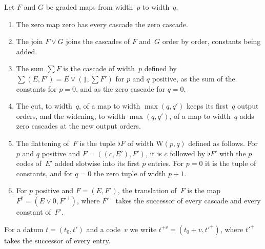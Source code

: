 \documentclass[11pt]{amsart}
\makeatletter
\newcommand{\bplus}{\mathbin{+}}
\newcommand{\num}[1]{\underline{#1}}          %
\newcommand{\W}{\mathrm{W}}
\newcommand{\tsum}[1]{\textstyle\sum #1}
\newif\ifagdarefs
\newcommand{\AgdaRefs}[1]{\ifagdarefs{\footnotesize\color{agdablue}(#1)}\else\unskip\fi}
\newcommand{\Agda}[2]{{\footnotesize\color{agdablue}\textsf{#1}%
  \ifblank{#2}{}{\texttt{.}\allowbreak\texttt{#2}}}}
\let\ttt@plain\texttt
\renewcommand{\texttt}[1]{{\footnotesize\color{agdablue}\ttt@plain{#1}}}
\theoremstyle{plain}
\theoremstyle{definition}
\makeatother
\begin{document}
\begin{definition}
\label{def:rect-ops}
Let $F$ and $G$ be graded maps from width~$p$ to width~$q$.
\begin{enumerate}
\item The zero map $\mathrm{zero}$ has every cascade the zero
  cascade.
\item The join $F \vee G$ joins the cascades of $F$ and~$G$ order by
  order, constants being added.
\item The sum $\tsum F$ is the cascade of width~$p$ defined by
  $\tsum (E, F') = E \vee (\num 1, \tsum F')$ for $p$ and $q$
  positive, as the sum of the constants for $p = 0$, and as the zero
  cascade for $q = 0$.
\item The cut, to width~$q$, of a map to width $\max(q,q')$ keeps its
  first~$q$ output orders, and the widening, to width $\max(q,q')$, of
  a map to width~$q$ adds zero cascades at the new output orders.
\item The flattening of~$F$ is the tuple $\flat F$ of width
  $\W(p,q)$ defined as follows. For $p$ and $q$ positive and
  $F = ((c, E'), F')$, it is $c$ followed by $\flat F'$ with the $p$
  codes of~$E'$ added slotwise into its first $p$ entries. For $p = 0$
  it is the tuple of constants, and for $q = 0$ the zero tuple of
  width $p+1$.
\item For $p$ positive and $F = (E, F')$, the translation of~$F$ is
  the map $F^{\dagger} = (E \vee 0, F'^{+})$, where $F'^{+}$ takes
  the successor of every cascade and every constant of~$F'$.
\end{enumerate}
For a datum $t = (t_0, t')$ and a code~$v$ we write
$t^{+v} = (t_0 \bplus v, t'^{+})$, where $t'^{+}$ takes the successor
of every entry.
\AgdaRefs{\Agda{BrouwerOrdinals.RectAlgebra}{zeroRD}; \texttt{joinRD},
\texttt{padRD}, \texttt{flatRD}, \texttt{addRDc};
\Agda{BrouwerOrdinals.RectSum}{sumRD};
\Agda{BrouwerOrdinals.RectApply}{preRD};
\Agda{BrouwerOrdinals.RectAdd}{sucRD}, \texttt{addν}.}
\end{definition}
\end{document}
